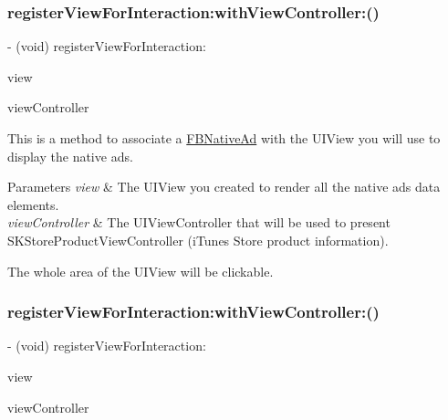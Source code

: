 \subsubsection{\texorpdfstring{register\+View\+For\+Interaction\+:with\+View\+Controller\+:()}{registerViewForInteraction:withViewController:()}\hspace{0.1cm}{\footnotesize\ttfamily [3/5]}}
{\footnotesize\ttfamily -\/ (void) register\+View\+For\+Interaction\+: \begin{DoxyParamCaption}\item[{(U\+I\+View $\ast$)}]{view }\item[{withViewController:(U\+I\+View\+Controller $\ast$)}]{view\+Controller }\end{DoxyParamCaption}}

This is a method to associate a \hyperlink{interfaceFBNativeAd}{F\+B\+Native\+Ad} with the U\+I\+View you will use to display the native ads.


\begin{DoxyParams}{Parameters}
{\em view} & The U\+I\+View you created to render all the native ads data elements. \\
\hline
{\em view\+Controller} & The U\+I\+View\+Controller that will be used to present S\+K\+Store\+Product\+View\+Controller (i\+Tunes Store product information).\\
\hline
\end{DoxyParams}
The whole area of the U\+I\+View will be clickable. \mbox{\label{interfaceFBNativeAd_af14f3514ad32a7b1b73ee6e94c1bba16}} 
\subsubsection{\texorpdfstring{register\+View\+For\+Interaction\+:with\+View\+Controller\+:()}{registerViewForInteraction:withViewController:()}\hspace{0.1cm}{\footnotesize\ttfamily [4/5]}}
{\footnotesize\ttfamily -\/ (void) register\+View\+For\+Interaction\+: \begin{DoxyParamCaption}\item[{(U\+I\+View $\ast$)}]{view }\item[{withViewController:(U\+I\+View\+Controller $\ast$)}]{view\+Controller }\end{DoxyParamCaption}}

